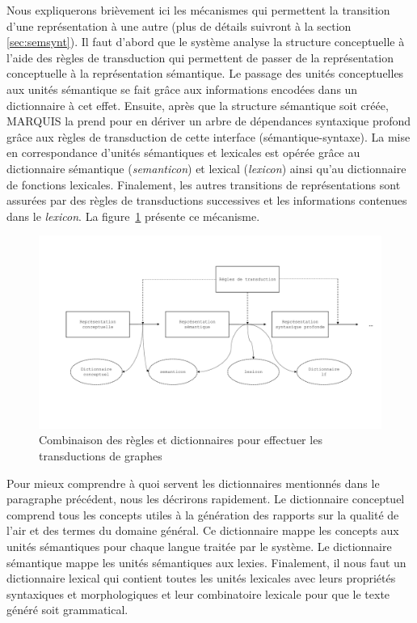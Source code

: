 Nous expliquerons brièvement ici les mécanismes qui permettent la transition d'une représentation à une autre (plus de détails suivront à la section \ref{sec:semsynt}). Il faut d'abord que le système analyse la structure conceptuelle à l'aide des règles de transduction qui permettent de passer de la représentation conceptuelle à la représentation sémantique. Le passage des unités conceptuelles aux unités sémantique se fait grâce aux informations encodées dans un dictionnaire à cet effet. Ensuite, après que la structure sémantique soit créée, MARQUIS la prend pour en dériver un arbre de dépendances syntaxique profond grâce aux règles de transduction de cette interface (sémantique-syntaxe). La mise en correspondance d'unités sémantiques et lexicales est opérée grâce au dictionnaire sémantique (\emph{semanticon}) et lexical (\emph{lexicon}) ainsi qu'au dictionnaire de fonctions lexicales. Finalement, les autres transitions de représentations sont assurées par des règles de transductions successives et les informations contenues dans le \emph{lexicon}. La figure~\ref{fig:reglesdict} présente ce mécanisme.

\begin{figure}[htb]
	\centering
	\includegraphics[width=1\textwidth, trim = {0cm 0cm 0cm 0cm},clip]{ch2/figs/module.pdf}
	\caption{Combinaison des règles et dictionnaires pour effectuer les transductions de graphes \citep{LambreyImplementationcollocationspour2017}}
	\label{fig:reglesdict}
\end{figure}

Pour mieux comprendre à quoi servent les dictionnaires mentionnés dans le paragraphe précédent, nous les décrirons rapidement. Le dictionnaire conceptuel comprend tous les concepts utiles à la génération des rapports sur la qualité de l'air et des termes du domaine général. Ce dictionnaire mappe les concepts aux unités sémantiques pour chaque langue traitée par le système. Le dictionnaire sémantique mappe les unités sémantiques aux lexies. Finalement, il nous faut un dictionnaire lexical qui contient toutes les unités lexicales avec leurs propriétés syntaxiques et morphologiques et leur combinatoire lexicale pour que le texte généré soit grammatical.

